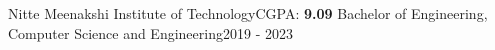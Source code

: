 \resumeSubheading
  {Nitte Meenakshi Institute of Technology}{CGPA: \textbf{9.09}}
  {Bachelor of Engineering, Computer Science and Engineering}{2019 - 2023}
